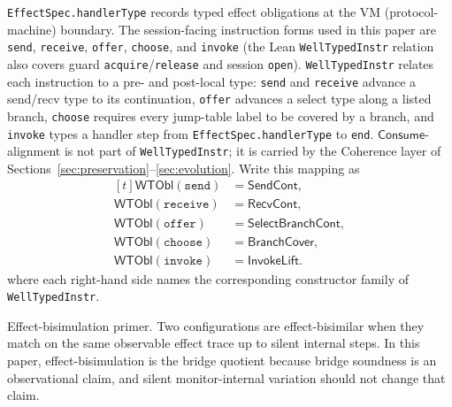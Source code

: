 \documentclass[a4paper,10pt,twocolumn,english]{article}
\numberwithin{equation}{section}
\theoremstyle{paperdef}
\theoremstyle{paperplain}
\theoremstyle{paperdef}
\theoremstyle{paperremark}
\newcommand{\Consume}{\ensuremath{\mathsf{Consume}}}
\begin{document}
\texttt{EffectSpec.handlerType} records typed effect obligations at the VM (protocol-machine) boundary.
The session-facing instruction forms used in this paper are \texttt{send}, \texttt{receive}, \texttt{offer},
\texttt{choose}, and \texttt{invoke} (the Lean \texttt{WellTypedInstr} relation also covers guard
\texttt{acquire}/\texttt{release} and session \texttt{open}). \texttt{WellTypedInstr} relates each
instruction to a pre- and post-local type: \texttt{send} and \texttt{receive} advance a send/recv
type to its continuation, \texttt{offer} advances a select type along a listed branch, \texttt{choose}
requires every jump-table label to be covered by a branch, and \texttt{invoke} types a handler step from
\texttt{EffectSpec.handlerType} to \texttt{end}. \Consume-alignment is not part of \texttt{WellTypedInstr};
it is carried by the Coherence layer of Sections~\ref{sec:preservation}--\ref{sec:evolution}.
Write this mapping as
\begin{equation}
	\begin{aligned}[t]
		\mathsf{WTObl}(\texttt{send})   & = \mathsf{SendCont},         \\
		\mathsf{WTObl}(\texttt{receive}) & = \mathsf{RecvCont},         \\
		\mathsf{WTObl}(\texttt{offer})   & = \mathsf{SelectBranchCont}, \\
		\mathsf{WTObl}(\texttt{choose})  & = \mathsf{BranchCover},      \\
		\mathsf{WTObl}(\texttt{invoke}) & = \mathsf{InvokeLift}.
	\end{aligned}
\end{equation}
where each right-hand side names the corresponding constructor family of \texttt{WellTypedInstr}.

Effect-bisimulation primer. Two configurations are effect-bisimilar when they
match on the same observable effect trace up to silent internal steps. In this
paper, effect-bisimulation is the bridge quotient because bridge soundness is
an observational claim, and silent monitor-internal variation should not change
that claim.
\end{document}

